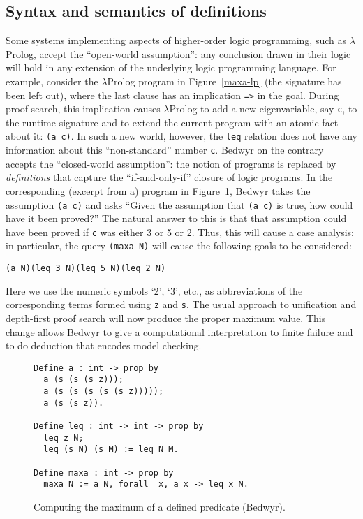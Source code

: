 \documentclass{article}
\newcommand{\lp}{$\lambda$Prolog}
\begin{document}
\subsection{Syntax and semantics of definitions}

Some systems implementing aspects of higher-order logic programming,
such as \lp{}, accept the ``open-world assumption'': any conclusion
drawn in their logic will hold in any extension of the underlying logic
programming language.
For example, consider the \lp{} program in Figure~\ref{maxa-lp} (the
signature has been left out), where the last clause has an implication
\verb.=>. in the goal. During proof search, this implication
causes \lp{} to add a new eigenvariable, say \verb.c., to the runtime
signature
and to extend the current program with an atomic fact about it:
\verb.(a c).. In such a new world, however, the {\tt leq} relation
does not have any information about this ``non-standard'' number
{\tt c}.
Bedwyr on the contrary accepts the ``closed-world assumption'': the
notion of programs is replaced by {\em definitions} that capture the
``if-and-only-if'' closure of logic programs. In the corresponding
(excerpt from a) program in Figure~\ref{maxa-bdw}, Bedwyr takes the
assumption \verb.(a c). and asks ``Given the assumption that
\verb.(a c). is true, how could have it been proved?'' The natural
answer to this is that that assumption could have been proved if
\verb.c. was either 3 or 5 or 2. Thus, this will cause a case analysis:
in particular, the query \verb.(maxa N). will cause the following goals
to be considered:
\begin{center}
  \tt(a N)\qquad(leq 3 N)\qquad(leq 5 N)\qquad(leq 2 N)
\end{center}
Here we use the numeric symbols `2', `3', etc., as abbreviations of the
corresponding terms formed using \texttt{z} and \texttt{s}. The usual
approach to unification and depth-first proof search will now produce
the proper maximum value. This change allows Bedwyr to give a
computational interpretation to finite failure and to do deduction that
encodes model checking.

\begin{figure}
\begin{verbatim}
Define a : int -> prop by
  a (s (s (s z)));
  a (s (s (s (s (s z)))));
  a (s (s z)).

Define leq : int -> int -> prop by
  leq z N;
  leq (s N) (s M) := leq N M.

Define maxa : int -> prop by
  maxa N := a N, forall  x, a x -> leq x N.
\end{verbatim}
\caption{Computing the maximum of a defined predicate (Bedwyr).}
\label{maxa-bdw}
\end{figure}
\end{document}
